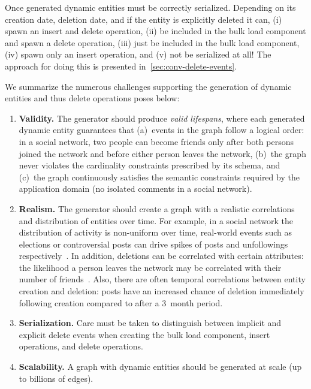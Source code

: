 Once generated dynamic entities must be correctly serialized.
Depending on its creation date, deletion date, and if the entity is explicitly deleted it can,
(i) spawn an insert and delete operation,
(ii) be included in the bulk load component and spawn a delete operation,
(iii) just be included in the bulk load component,
(iv) spawn only an insert operation, and
(v) not be serialized at all!
The approach for doing this is presented in~\autoref{sec:conv-delete-events}.

We summarize the numerous challenges supporting the generation of dynamic entities and thus delete operations poses below:
\begin{enumerate}
\item \textbf{Validity.} The generator should produce \emph{valid lifespans},
where each generated dynamic entity guarantees that
(a)~events in the graph follow a logical order: \eg in a social network, two people can become friends only after both persons joined the network and before either person leaves the network,
(b)~the graph never violates the cardinality constraints prescribed by its schema, and
(c)~the graph continuously satisfies the semantic constraints required by the application domain (\eg no isolated comments in a social network).
\item \textbf{Realism.} The generator should create a graph with a realistic correlations and distribution of entities over time.
For example, in a social network the distribution of activity is non-uniform over time, real-world events such as elections or controversial posts %
can drive spikes of posts and unfollowings respectively~\cite{DBLP:conf/www/MyersL14}.
In addition, deletions can be correlated with certain attributes: \eg the likelihood a person leaves the network may be correlated with their number of friends~\cite{Lorincz2019}.
Also, there are often temporal correlations between entity creation and deletion: \eg posts have an increased chance of deletion immediately following creation compared to after a 3~month period.
\item \textbf{Serialization.} Care must be taken to distinguish between implicit and explicit delete events when creating the bulk load component, insert operations, and delete operations.
\item \textbf{Scalability.} A graph with dynamic entities should be generated at scale (up to billions of edges).
\end{enumerate}



